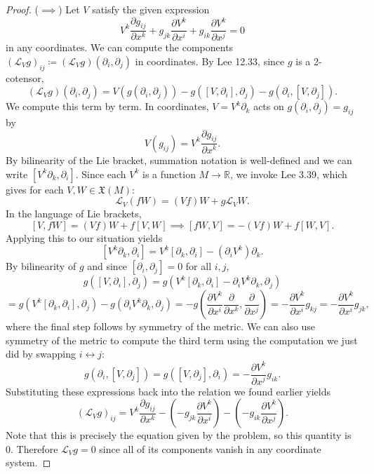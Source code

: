 \documentclass[11pt, letterpaper]{article}
\begin{document}
\begin{proof}
    ($\implies $) Let $V$ satisfy the given expression
    \[
	    V^k \frac{\partial g_{ij} }{\partial x^k} +g_{jk} \frac{\partial V^k}{\partial x^i} +g_{ik} \frac{\partial V^k}{\partial x^j} =0
    \]
    in any coordinates. We can compute the components $(\mathcal{L} _Vg)_{ij} \coloneqq (\mathcal{L} _Vg)(\partial _i,\partial _j)$ in coordinates. By Lee 12.33, since $g$ is a 2-cotensor,
    \[
	    (\mathcal{L} _Vg)(\partial _i,\partial _j) = V(g(\partial _i,\partial _j)) - g([V,\partial _i],\partial _j) - g(\partial _i,[V,\partial _j])
    .\]
    We compute this term by term. In coordinates, $V=V^k \partial _k$ acts on $g(\partial _i,\partial _j)=g_{ij} $ by
    \[
    	V(g_{ij} )=V^k \frac{\partial g_{ij} }{\partial x^k} 
    .\]
    By bilinearity of the Lie bracket, summation notation is well-defined and we can write $[V^k \partial _k,\partial _i]$. Since each $V^k$ is a function $M\to \mathbb{R} $, we invoke Lee 3.39, which gives for each $V,W\in \mathfrak{X} (M)$:
    \[
    	\mathcal{L} _V(fW)=(Vf)W + g\mathcal{L} _VW
    .\]
    In the language of Lie brackets,
    \[
	    [V,fW]=(Vf)W + f[V,W] \implies [fW,V]=-(Vf)W + f[W,V]
    .\]
    Applying this to our situation yields
    \[
	    [V^k\partial _k,\partial _i]=V^k[\partial _k,\partial _i] - (\partial _iV^k)\partial _k
    .\]
    By bilinearity of $g$ and since $[\partial _i,\partial _j]=0$ for all $i,j$,
    \[
	    g([V,\partial _i],\partial _j)=g(V^k[\partial _k,\partial _i]-\partial _iV^k \partial _k,\partial _j)
    \]
    \[
	    =g(V^k[\partial _k, \partial _i],\partial _j)-g(\partial _iV^k \partial _k,\partial _j)=-g\left( \frac{\partial V^k}{\partial x^i} \frac{\partial }{\partial x^k} ,\frac{\partial }{\partial x^j}  \right) =- \frac{\partial V^k}{\partial x^i} g_{kj} = - \frac{\partial V^k}{\partial x^i} g_{jk} ,
    \]
    where the final step follows by symmetry of the metric. We can also use symmetry of the metric to compute the third term using the computation we just did by swapping $i \leftrightarrow j$:
    \[
	    g(\partial _i,[V,\partial _j])=g([V,\partial _j],\partial _i)=-\frac{\partial V^k}{\partial x^j} g_{ik} 
    .\]
    Substituting these expressions back into the relation we found earlier yields
    \[
	    (\mathcal{L} _Vg)_{ij} =V^k \frac{\partial g_{ij} }{\partial x^k} -\left( -g_{jk} \frac{\partial V^k}{\partial x^i}  \right) -\left( -g_{ik} \frac{\partial V^k}{\partial x^j}  \right) 
    .\]
    Note that this is precisely the equation given by the problem, so this quantity is 0. Therefore $\mathcal{L}_Vg=0$ since all of its components vanish in any coordinate system.


\end{proof}
\end{document}
